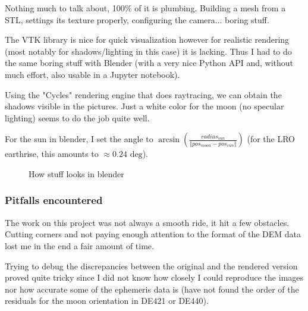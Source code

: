 \documentclass[14pt]{article}
\begin{document}
Nothing much to talk about, 100\% of it is plumbing. Building a mesh from a STL, settings its texture properly, configuring the camera... boring stuff.

The VTK library is nice for quick visualization however for realistic rendering (most notably for shadows/lighting in this case) it is lacking.
Thus I had to do the same boring stuff with Blender (with a very nice Python API and, without much effort, also usable in a Jupyter notebook).

Using the "Cycles" rendering engine that does raytracing, we can obtain the shadows visible in the pictures.
Just a white color for the moon (no specular lighting) seems to do the job quite well.

For the sun in blender, I set the angle to $\arcsin\left(\frac{radius_{sun}}{\Vert pos_{moon} - pos_{sun}\Vert }\right)$ (for the LRO earthrise, this amounts to $\approx 0.24\text{ deg}$).


\begin{figure}[H]
  \centering
  \qquad
  \caption{How stuff looks in blender}
\end{figure}


\subsubsection{Pitfalls encountered}

The work on this project was not always a smooth ride, it hit a few obstacles. Cutting corners and not paying enough attention to the format of the DEM data lost me in the end a fair amount of time.

Trying to debug the discrepancies between the original and the rendered version proved quite tricky since I did not know how closely I could reproduce the images nor how accurate some of the ephemeris data is (have not found the order of the residuals for the moon orientation in DE421 or DE440).
\end{document}
